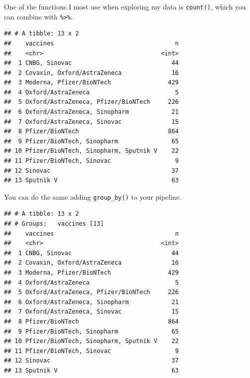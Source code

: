 \documentclass[
]{book}
\newenvironment{Shaded}{\begin{snugshade}}{\end{snugshade}}
\newcommand{\KeywordTok}[1]{\textcolor[rgb]{0.13,0.29,0.53}{\textbf{#1}}}
\newcommand{\NormalTok}[1]{#1}
\newcommand{\OperatorTok}[1]{\textcolor[rgb]{0.81,0.36,0.00}{\textbf{#1}}}
\newcommand{\StringTok}[1]{\textcolor[rgb]{0.31,0.60,0.02}{#1}}
\begin{document}
One of the functions I most use when exploring my data is \texttt{count()}, which you can combine with \texttt{\%\textgreater{}\%}.

\begin{Shaded}
\end{Shaded}

\begin{verbatim}
## # A tibble: 13 x 2
##    vaccines                                  n
##    <chr>                                 <int>
##  1 CNBG, Sinovac                            44
##  2 Covaxin, Oxford/AstraZeneca              16
##  3 Moderna, Pfizer/BioNTech                429
##  4 Oxford/AstraZeneca                        5
##  5 Oxford/AstraZeneca, Pfizer/BioNTech     226
##  6 Oxford/AstraZeneca, Sinopharm            21
##  7 Oxford/AstraZeneca, Sinovac              15
##  8 Pfizer/BioNTech                         864
##  9 Pfizer/BioNTech, Sinopharm               65
## 10 Pfizer/BioNTech, Sinopharm, Sputnik V    22
## 11 Pfizer/BioNTech, Sinovac                  9
## 12 Sinovac                                  37
## 13 Sputnik V                                63
\end{verbatim}

You can do the same adding \texttt{group\_by()} to your pipeline.

\begin{Shaded}
\end{Shaded}

\begin{verbatim}
## # A tibble: 13 x 2
## # Groups:   vaccines [13]
##    vaccines                                  n
##    <chr>                                 <int>
##  1 CNBG, Sinovac                            44
##  2 Covaxin, Oxford/AstraZeneca              16
##  3 Moderna, Pfizer/BioNTech                429
##  4 Oxford/AstraZeneca                        5
##  5 Oxford/AstraZeneca, Pfizer/BioNTech     226
##  6 Oxford/AstraZeneca, Sinopharm            21
##  7 Oxford/AstraZeneca, Sinovac              15
##  8 Pfizer/BioNTech                         864
##  9 Pfizer/BioNTech, Sinopharm               65
## 10 Pfizer/BioNTech, Sinopharm, Sputnik V    22
## 11 Pfizer/BioNTech, Sinovac                  9
## 12 Sinovac                                  37
## 13 Sputnik V                                63
\end{verbatim}
\end{document}
